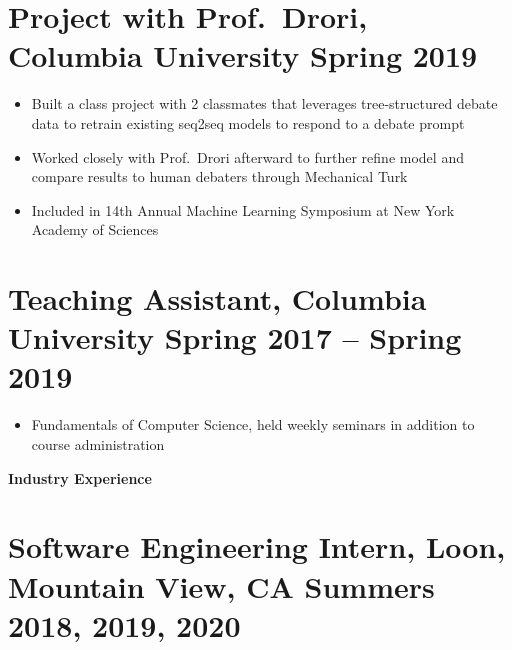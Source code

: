\documentclass{article}
\begin{document}
\section*{\textbf{Project with Prof.\ Drori, Columbia University \hfill Spring 2019}}
\begin{itemize}[noitemsep]
  \item Built a class project with 2 classmates that leverages tree-structured debate data to retrain existing seq2seq models to respond to a debate prompt
  \item Worked closely with Prof.\ Drori afterward to further refine model and compare results to human debaters through Mechanical Turk
  \item Included in 14th Annual Machine Learning Symposium at New York Academy of Sciences
\end{itemize}

\section*{\textbf{Teaching Assistant, Columbia University \hfill	Spring 2017 -- Spring 2019 }}
\begin{itemize}
    \item Fundamentals of Computer Science, held weekly seminars in addition to course administration
\end{itemize}


\noindent
\large{\textbf{Industry Experience}}
\section*{\textbf{Software Engineering Intern, Loon, Mountain View, CA \hfill Summers 2018, 2019, 2020}}
\end{document}
